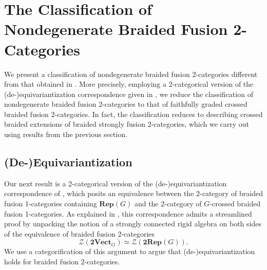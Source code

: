 \documentclass[11pt,reqno]{amsart}
\numberwithin{equation}{section}
\theoremstyle{plain}
\theoremstyle{definition}
\begin{document}
\section{The Classification of Nondegenerate Braided Fusion 2-Categories}\label{section:BF2C}

We present a classification of nondegenerate braided fusion 2-categories different from that obtained in \cite{JF}.
More precisely, employing a 2-categorical version of the (de-)equivariantization correspondence given in \cite{DGNO}, we reduce the classification of nondegenerate braided fusion 2-categories to that of faithfully graded crossed braided fusion 2-categories.
In fact, the classification reduces to describing crossed braided extensions of braided strongly fusion 2-categories, which we carry out using results from the previous section.

\subsection{(De-)Equivariantization}

Our next result is a 2-categorical version of the (de-)equivariant\-ization correspondence of \cite[Theorem 4.44]{DGNO}, which posits an equivalence between the 2-category of braided fusion 1-categories containing $\mathbf{Rep}(G)$ and the 2-category of $G$-crossed braided fusion 1-categories. As explained in \cite[Remark 3.10]{D9}, this correspondence admits a streamlined proof by unpacking the notion of a strongly connected rigid algebra on both sides of the equivalence of braided fusion 2-categories 
\begin{equation}\label{eq:Z2VGZ2RG}
\mathcal{Z}(\mathbf{2Vect}_G)\simeq\mathcal{Z}(\mathbf{2Rep}(G)).
\end{equation}
We use a categorification of this argument to argue that (de-)equivariantization holds for braided fusion 2-categories.
\end{document}

